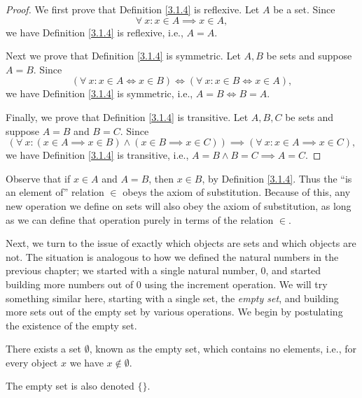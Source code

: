 \begin{proof}
We first prove that Definition \ref{3.1.4} is reflexive.
Let \(A\) be a set.
Since
\[
    \forall\ x : x \in A \implies x \in A,
\]
we have Definition \ref{3.1.4} is reflexive, i.e., \(A = A\).

Next we prove that Definition \ref{3.1.4} is symmetric.
Let \(A, B\) be sets and suppose \(A = B\).
Since
\[
    (\forall\ x : x \in A \iff x \in B) \iff (\forall\ x : x \in B \iff x \in A),
\]
we have Definition \ref{3.1.4} is symmetric, i.e., \(A = B \iff B = A\).

Finally, we prove that Definition \ref{3.1.4} is transitive.
Let \(A, B, C\) be sets and suppose \(A = B\) and \(B = C\).
Since
\[
    (\forall\ x : (x \in A \implies x \in B) \land (x \in B \implies x \in C)) \implies (\forall\ x : x \in A \implies x \in C),
\]
we have Definition \ref{3.1.4} is transitive, i.e., \(A = B \land B = C \implies A = C\).
\end{proof}

\begin{note}
Observe that if \(x \in A\) and \(A = B\), then \(x \in B\), by Definition \ref{3.1.4}.
Thus the ``is an element of'' relation \(\in\) obeys the axiom of substitution.
Because of this, any new operation we define on sets will also obey the axiom of substitution, as long as we can define that operation purely in terms of the relation \(\in\).
\end{note}

\begin{note}
Next, we turn to the issue of exactly which objects are sets and which objects are not.
The situation is analogous to how we defined the natural numbers in the previous chapter;
we started with a single natural number, \(0\), and started building more numbers out of \(0\) using the increment operation.
We will try something similar here, starting with a single set, the \emph{empty set},
and building more sets out of the empty set by various operations.
We begin by postulating the existence of the empty set.
\end{note}

\begin{axiom}\label{3.2}
There exists a set \(\emptyset\), known as the empty set, which contains no elements, i.e., for every object \(x\) we have \(x \notin \emptyset\).
\end{axiom}

\begin{note}
The empty set is also denoted \(\{\}\).
\end{note}

